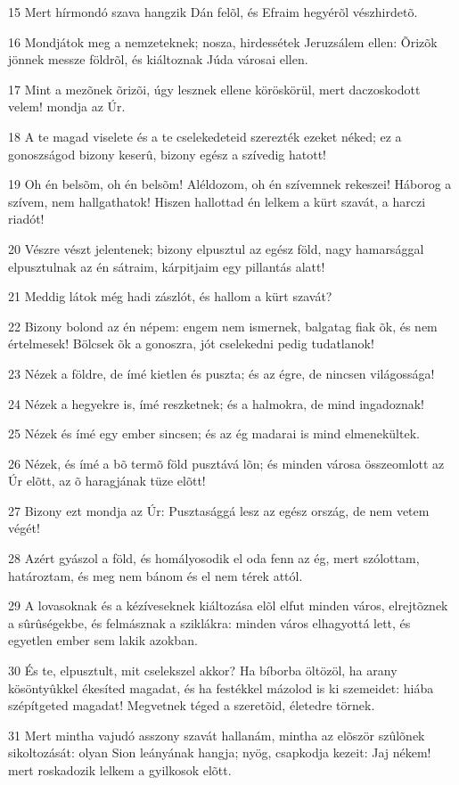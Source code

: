 \par 15 Mert hírmondó szava hangzik Dán felõl, és Efraim hegyérõl vészhirdetõ.
\par 16 Mondjátok meg a nemzeteknek; nosza, hirdessétek Jeruzsálem ellen: Õrizõk jönnek messze földrõl, és kiáltoznak Júda városai ellen.
\par 17 Mint a mezõnek õrizõi, úgy lesznek ellene köröskörül, mert daczoskodott velem! mondja az Úr.
\par 18 A te magad viselete és a te cselekedeteid szerezték ezeket néked; ez a gonoszságod bizony keserû, bizony egész a szívedig hatott!
\par 19 Oh én belsõm, oh én belsõm! Aléldozom, oh én szívemnek rekeszei! Háborog a szívem, nem hallgathatok! Hiszen hallottad én lelkem a kürt szavát, a harczi riadót!
\par 20 Vészre vészt jelentenek; bizony elpusztul az egész föld, nagy hamarsággal elpusztulnak az én sátraim, kárpitjaim egy pillantás alatt!
\par 21 Meddig látok még hadi zászlót, és hallom a kürt szavát?
\par 22 Bizony bolond az én népem: engem nem ismernek, balgatag fiak õk, és nem értelmesek! Bölcsek õk a gonoszra, jót cselekedni pedig tudatlanok!
\par 23 Nézek a földre, de ímé kietlen és puszta; és az égre, de nincsen világossága!
\par 24 Nézek a hegyekre is, ímé reszketnek; és a halmokra, de mind ingadoznak!
\par 25 Nézek és ímé egy ember sincsen; és az ég madarai is mind elmenekültek.
\par 26 Nézek, és ímé a bõ termõ föld pusztává lõn; és minden városa összeomlott az Úr elõtt, az õ haragjának tüze elõtt!
\par 27 Bizony ezt mondja az Úr: Pusztasággá lesz az egész ország, de nem vetem  végét!
\par 28 Azért gyászol a föld, és homályosodik el oda fenn az ég, mert szólottam, határoztam, és meg nem bánom és el nem térek attól.
\par 29 A lovasoknak és a kézíveseknek kiáltozása elõl elfut minden város, elrejtõznek a sûrûségekbe, és felmásznak a sziklákra: minden város elhagyottá lett, és egyetlen ember sem lakik azokban.
\par 30 És te, elpusztult, mit cselekszel akkor? Ha bíborba öltözöl, ha arany kösöntyûkkel ékesíted magadat, és ha festékkel mázolod is ki szemeidet: hiába szépítgeted magadat! Megvetnek téged  a szeretõid, életedre törnek.
\par 31 Mert mintha vajudó asszony szavát hallanám, mintha az elõször szûlõnek sikoltozását: olyan Sion leányának hangja; nyög, csapkodja kezeit: Jaj nékem! mert roskadozik lelkem a gyilkosok elõtt.

